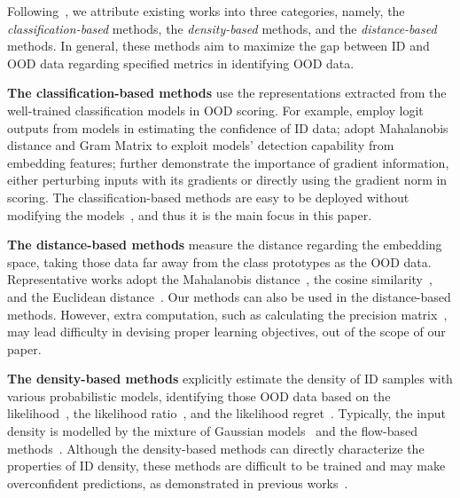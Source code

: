 \documentclass{article}
\begin{document}
Following~\cite{yang2021generalized}, we attribute existing works into three categories, namely, the \emph{classification-based} methods, the \emph{density-based} methods, and the \emph{distance-based} methods. In general, these methods aim to maximize the gap between ID and OOD data regarding specified metrics in identifying OOD data. 

\textbf{The classification-based methods} use the representations extracted from the well-trained classification models in OOD scoring. For example, \cite{hendrycks2016baseline,LiangLS18,liu2020energy,morteza2021provable,sun2021react,wang2021can} employ logit outputs from models in estimating the confidence of ID data; \cite{lee2018simple,sastry2019detecting} adopt Mahalanobis distance and Gram Matrix to exploit models' detection capability from embedding features; \cite{huang2021importance,LiangLS18} further demonstrate the importance of gradient information, either perturbing inputs with its gradients or directly using the gradient norm in scoring. The classification-based methods are easy to be deployed without modifying the models~\cite{yang2021generalized}, and thus it is the main focus in this paper. 

\textbf{The distance-based methods} measure the distance regarding the embedding space, taking those data far away from the class prototypes as the OOD data. Representative works adopt the Mahalanobis distance~\cite{huang2021importance,lee2018simple}, the cosine similarity~\cite{ChenLSZ20,zaeemzadeh2021out}, and the Euclidean distance~\cite{huang2020feature}. Our methods can also be used in the distance-based methods. However, extra computation, such as calculating the precision matrix~\cite{lee2018simple}, may lead difficulty in devising proper learning objectives, out of the scope of our paper. 

\textbf{The density-based methods} explicitly estimate the density of ID samples with various probabilistic models, identifying those OOD data based on the likelihood~\cite{lee2018simple}, the likelihood ratio~\cite{li2022ood,RenLFSPDDL19,SerraAGSNL20}, and the likelihood regret~\cite{XiaoYA20}. Typically, the input density is modelled by the mixture of Gaussian models~\cite{lee2018simple} and the flow-based methods~\cite{KirichenkoIW20,nalisnickdo19}. Although the density-based methods can directly characterize the properties of ID density, these methods are difficult to be trained and may make overconfident predictions, as demonstrated in previous works~\cite{morteza2021provable,nalisnickdo19}. 
\end{document}
